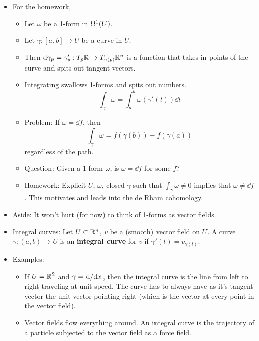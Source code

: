 \documentclass[../notes.tex]{subfiles}
\begin{document}
\begin{itemize}
\begin{itemize}
\begin{enumerate}
        \end{enumerate}
    \end{itemize}
    \item For the homework,
    \begin{itemize}
        \item Let $\omega$ be a 1-form in $\ome[1]{U}$.
        \item Let $\gamma:[a,b]\to U$ be a curve in $U$.
        \item Then $\dd{\gamma_p}=\gamma_p':T_p\R\to T_{\gamma(p)}\R^n$ is a function that takes in points of the curve and spits out tangent vectors.
        \item Integrating swallows 1-forms and spits out numbers.
        \begin{equation*}
            \int_\gamma\omega = \int_a^b\omega(\gamma'(t))\dd{t}
        \end{equation*}
        \item Problem: If $\omega=\dd{f}$, then
        \begin{equation*}
            \int_\gamma\omega = f(\gamma(b))-f(\gamma(a))
        \end{equation*}
        regardless of the path.
        \item Question: Given a 1-form $\omega$, is $\omega=\dd{f}$ for some $f$?
        \item Homework: Explicit $U$, $\omega$, closed $\gamma$ such that $\int_\gamma\omega\neq 0$ implies that $\omega\neq\dd{f}$. This motivates and leads into the de Rham cohomology.
    \end{itemize}
    \item Aside: It won't hurt (for now) to think of 1-forms as vector fields.
    \item Integral curves: Let $U\subset\R^n$, $v$ be a (smooth) vector field on $U$. A curve $\gamma:(a,b)\to U$ is an \textbf{integral curve} for $v$ if $\gamma'(t)=v_{\gamma(t)}$.
    \item Examples:
    \begin{itemize}
        \item If $U=\R^2$ and $\gamma=\dv*{x}$, then the integral curve is the line from left to right traveling at unit speed. The curve has to always have as it's tangent vector the unit vector pointing right (which is the vector at every point in the vector field).
        \item Vector fields flow everything around. An integral curve is the trajectory of a particle subjected to the vector field as a force field.

\end{itemize}
\end{itemize}
\end{document}
